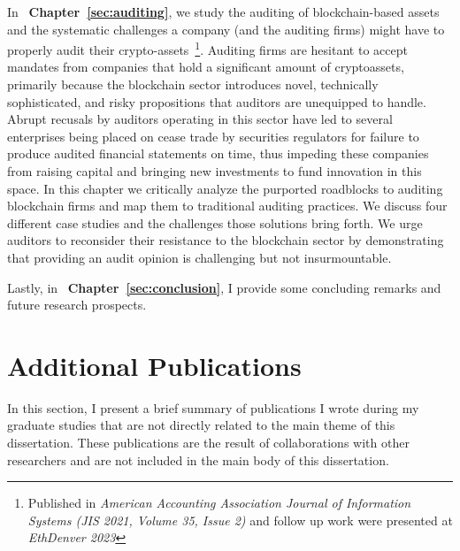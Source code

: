 In ~\textbf{Chapter~\ref{sec:auditing}}, we study the auditing of blockchain-based assets and the systematic challenges a company (and the auditing firms) might have to properly audit their crypto-assets~\cite{pimentel2021systemizing}\footnote{Published in \textit{American Accounting Association Journal of Information Systems (JIS 2021, Volume 35, Issue 2)} and follow up work were presented at \textit{EthDenver 2023}}. Auditing firms are hesitant to accept mandates from companies that hold a significant amount of cryptoassets, primarily because the blockchain sector introduces novel, technically sophisticated, and risky propositions that auditors are unequipped to handle. Abrupt recusals by auditors operating in this sector have led to several enterprises being placed on cease trade by securities regulators for failure to produce audited financial statements on time, thus impeding these companies from raising capital and bringing new investments to fund innovation in this space. In this chapter we critically analyze the purported roadblocks to auditing blockchain firms and map them to traditional auditing practices. We discuss four different case studies and the challenges those solutions bring forth. We urge auditors to reconsider their resistance to the blockchain sector by demonstrating that providing an audit opinion is challenging but not insurmountable.

Lastly, in ~\textbf{Chapter~\ref{sec:conclusion}}, I provide some concluding remarks and future research prospects.

\section{Additional Publications}
In this section, I present a brief summary of publications I wrote during my graduate studies that are not directly related to the main theme of this dissertation. These publications are the result of collaborations with other researchers and are not included in the main body of this dissertation.

